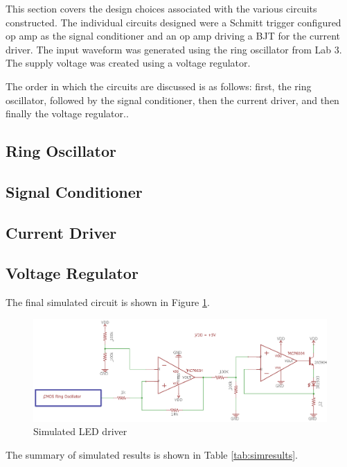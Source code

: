 



This section covers the design choices associated with the various circuits constructed. The individual circuits designed were a Schmitt trigger configured op amp as the signal conditioner and an op amp driving a BJT for the current driver. The input waveform was generated using the ring oscillator from Lab 3. The supply voltage was created using a voltage regulator.

The order in which the circuits are discussed is as follows: first, the ring oscillator, followed by the signal conditioner, then the current driver, and then finally the voltage regulator.. 

\subsection{Ring Oscillator}


\subsection{Signal Conditioner}


\subsection{Current Driver}


\subsection{Voltage Regulator}


The final simulated circuit is shown in Figure \ref{fig:finalschemlab4}.
\begin{figure}
	\centering
	\includegraphics[width=0.7\linewidth]{CircuitDevelopment/FinalschemLab4}
	\caption[Simulated circuit]{Simulated LED driver}
	\label{fig:finalschemlab4}
\end{figure}
The summary of simulated results is shown in Table \ref{tab:simresults}.

